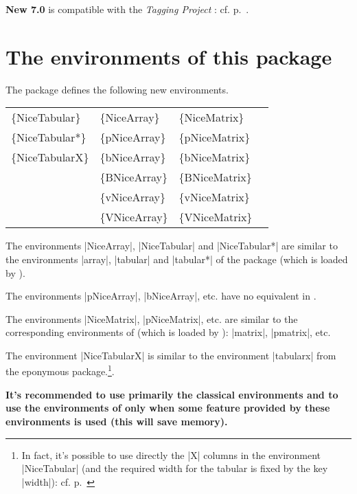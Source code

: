 \documentclass[dvipsnames]{article}%
\begin{document}
\medskip
\colorbox{yellow!50}{\bfseries New 7.0}\enskip {} is 
compatible with the \emph{Tagging Project} : cf. p.~\pageref{Tagging Project}.



\newpage

\section{The environments of this package} 

The package  defines the following new environments.

\medskip
\begin{ttfamily}
\setlength{\tabcolsep}{3mm}
\begin{tabular}{llll}
\{NiceTabular\}  & \{NiceArray\}  & \{NiceMatrix\}   \\
\{NiceTabular*\} & \{pNiceArray\} & \{pNiceMatrix\}  \\
\{NiceTabularX\} & \{bNiceArray\} & \{bNiceMatrix\}  \\
                 & \{BNiceArray\} & \{BNiceMatrix\}  \\
                 & \{vNiceArray\} & \{vNiceMatrix\}  \\
                 & \{VNiceArray\} & \{VNiceMatrix\}  
\end{tabular}
\end{ttfamily}

%
\medskip
The environments |{NiceArray}|, |{NiceTabular}| and |{NiceTabular*}| are
similar to the environments |{array}|, |{tabular}| and |{tabular*}| of the
package  (which is loaded by ).

\medskip
The environments |{pNiceArray}|, |{bNiceArray}|, etc. have no equivalent in
. 

\medskip
The environments |{NiceMatrix}|, |{pNiceMatrix}|, etc. are similar to the
corresponding environments of  (which is loaded by
): |{matrix}|, |{pmatrix}|, etc. 

\medskip
The environment |{NiceTabularX}| is similar to the environment |{tabularx}|
from the eponymous package.\footnote{In fact, it's possible to use directly the
|X| columns in the environment |{NiceTabular}| (and the required
width for the tabular is fixed by the key |width|): cf. p.~\pageref{X-columns}}.

\medskip
\textbf{It's recommended to use primarily the classical environments and to use the
environments of  only when some feature provided by these
environments is used (this will save memory).}
\end{document}

